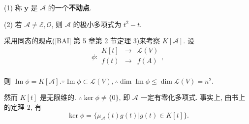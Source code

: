\documentclass{ctexart}
\begin{document}
\begin{note}
    (1) 称 $\boldsymbol{y}$ 是 $\mathcal{A}$ 的一个\textbf{不动点}.

    (2) 若 $\mathcal{A}\neq\mathcal{E},\mathcal{O}$, 则 $\mathcal{A}$ 的极小多项式为 $t^2-t$.
\end{note}
采用同态的观点([BAI] 第 5 章第 2 节定理 3)来考察 $K[\mathcal{A}]$. 设
\[\phi:\begin{array}{rcl}
    K[t] & \to & \mathcal{L}(V) \\
    f(t) & \to & f(A) \\
\end{array},\]

则 $\operatorname{Im}\phi=K[\mathcal{A}].\because\operatorname{Im}\phi\subset\mathcal{L}(V),\therefore\dim\operatorname{Im}\phi\leq\dim\mathcal{L}(V)=n^2$.

然而 $K[t]$ 是无限维的. $\therefore\ker\phi\neq\{0\}$, 即 $\mathcal{A}$ 一定有零化多项式. 事实上, 由书上的定理 2, 有
\[\ker\phi=\{\mu_\mathcal{A}(t)g(t)|g(t)\in K[t]\}.\]
\end{document}
